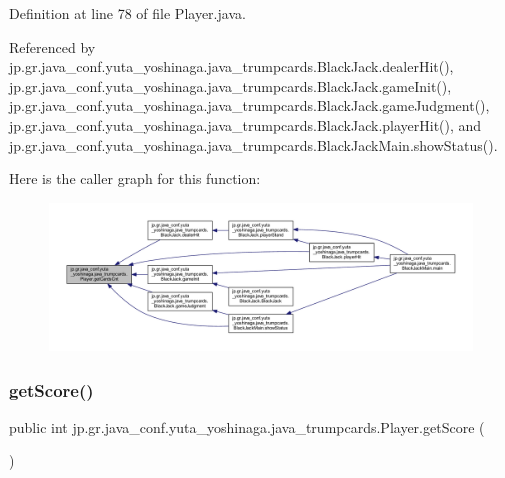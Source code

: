 Definition at line 78 of file Player.\+java.



Referenced by jp.\+gr.\+java\+\_\+conf.\+yuta\+\_\+yoshinaga.\+java\+\_\+trumpcards.\+Black\+Jack.\+dealer\+Hit(), jp.\+gr.\+java\+\_\+conf.\+yuta\+\_\+yoshinaga.\+java\+\_\+trumpcards.\+Black\+Jack.\+game\+Init(), jp.\+gr.\+java\+\_\+conf.\+yuta\+\_\+yoshinaga.\+java\+\_\+trumpcards.\+Black\+Jack.\+game\+Judgment(), jp.\+gr.\+java\+\_\+conf.\+yuta\+\_\+yoshinaga.\+java\+\_\+trumpcards.\+Black\+Jack.\+player\+Hit(), and jp.\+gr.\+java\+\_\+conf.\+yuta\+\_\+yoshinaga.\+java\+\_\+trumpcards.\+Black\+Jack\+Main.\+show\+Status().

Here is the caller graph for this function\+:
\nopagebreak
\begin{figure}[H]
\begin{center}
\leavevmode
\includegraphics[width=350pt]{classjp_1_1gr_1_1java__conf_1_1yuta__yoshinaga_1_1java__trumpcards_1_1_player_ae905e0de5c47509076823375e6995806_icgraph}
\end{center}
\end{figure}
\mbox{\label{classjp_1_1gr_1_1java__conf_1_1yuta__yoshinaga_1_1java__trumpcards_1_1_player_a1158aaad3ebc046ddc15e7f5596b14b4}} 
\subsubsection{\texorpdfstring{get\+Score()}{getScore()}}
{\footnotesize\ttfamily public int jp.\+gr.\+java\+\_\+conf.\+yuta\+\_\+yoshinaga.\+java\+\_\+trumpcards.\+Player.\+get\+Score (\begin{DoxyParamCaption}{ }\end{DoxyParamCaption})}



